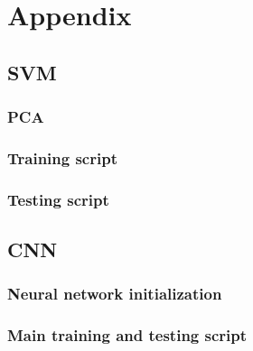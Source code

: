 \documentclass[12pt]{article}
\begin{document}
\newpage
\section*{Appendix}
\subsection*{SVM}
\subsubsection*{PCA}

\newpage
\subsubsection*{Training script}

\newpage
\subsubsection*{Testing script}

\newpage
\subsection*{CNN}
\subsubsection*{Neural network initialization}

\newpage
\subsubsection*{Main training and testing script}

\end{document}
